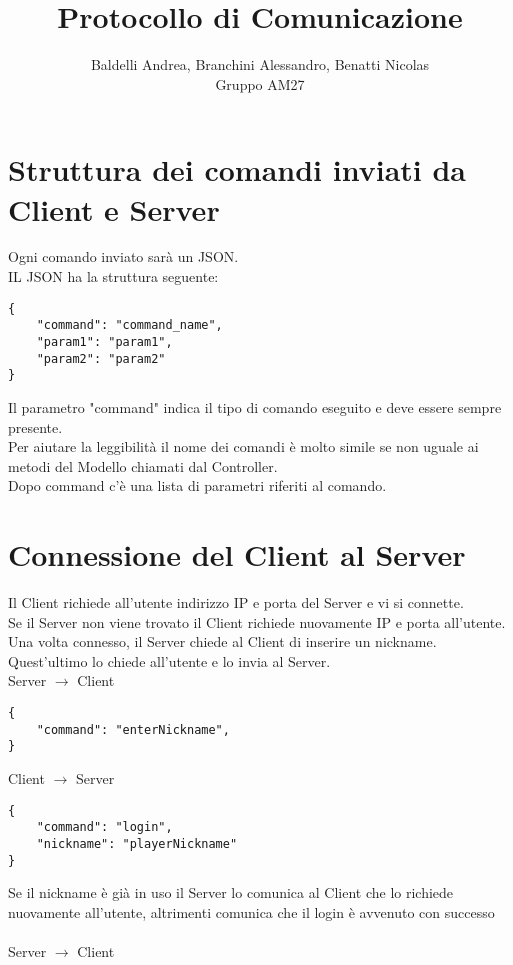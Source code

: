\documentclass{article}
\title{Protocollo di Comunicazione}
\author{Baldelli Andrea, Branchini Alessandro, Benatti Nicolas\\Gruppo AM27}
\begin{document}
\maketitle

\section{Struttura dei comandi inviati da Client e Server}

Ogni comando inviato sarà un JSON.\\
IL JSON ha la struttura seguente:

\begin{verbatim}
{
	"command": "command_name",
	"param1": "param1",
	"param2": "param2"
}
\end{verbatim}

\noindent Il parametro "command" indica il tipo di comando eseguito e deve essere sempre presente.\\
Per aiutare la leggibilità il nome dei comandi è molto simile se non uguale ai metodi del Modello chiamati dal Controller.\\
Dopo command c'è una lista di parametri riferiti al comando.

\bigskip
\section{Connessione del Client al Server}

Il Client richiede all'utente indirizzo IP e porta del Server e vi si connette.\\
Se il Server non viene trovato il Client richiede nuovamente IP e porta all'utente.\\
Una volta connesso, il Server chiede al Client di inserire un nickname. Quest'ultimo lo chiede all'utente e lo invia al Server.\\

\noindent Server $\rightarrow$ Client

\begin{verbatim}
{
	"command": "enterNickname",
}
\end{verbatim}

\noindent Client $\rightarrow$ Server

\begin{verbatim}
{
	"command": "login",
	"nickname": "playerNickname"
}
\end{verbatim}

\noindent Se il nickname è già in uso il Server lo comunica al Client che lo richiede nuovamente all'utente, altrimenti comunica che il login è avvenuto con successo\\\\
\noindent Server $\rightarrow$ Client
\end{document}
